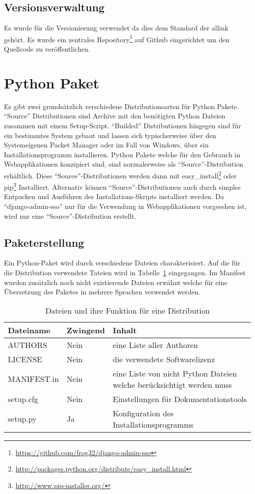\subsection{Versionsverwaltung}
\label{sub:versionsverwaltung}
Es wurde  für die Versionierung verwendet da dies dem Standard der allink gehört. Es wurde ein zentrales Repository\footnote{\url{https://github.com/frog32/django-admin-sso}} auf Github eingerichtet um den Quellcode zu veröffentlichen.

\section{Python Paket}
\label{sec:Python Paket}
Es gibt zwei grundsätzlich verschiedene Distributionsarten für Python Pakete. ``Source'' Distributionen sind Archive mit den benötigten Python Dateien zusammen mit einem Setup-Script. ``Builded'' Distributionen hingegen sind für ein bestimmtes System gebaut und lassen sich typischerweise über den Systemeigenen Packet Manager oder im Fall von Windows, über ein Installationsprogramm installieren. Python Pakete welche für den Gebrauch in Webapplikationen konzipiert sind, sind normalerweise als ``Source''-Distribution erhältlich. Diese ``Source''-Distributionen werden dann mit easy\_install\footnote{\url{http://packages.python.org/distribute/easy_install.html}} oder pip\footnote{\url{http://www.pip-installer.org/}} Installiert. Alternativ können ``Source''-Distributionen auch durch simples Entpacken und Ausführen des Installations-Skripts installiert werden. Da ``django-admin-sso'' nur für die Verwendung in Webapplikationen vorgesehen ist, wird nur eine ``Source''-Distribution erstellt.

\subsection{Paketerstellung}
\label{sub:paketerstellung}
Ein Python-Paket wird durch verschiedene Dateien charakterisiert. Auf die für die Distribution verwendete Tateien wird in Tabelle~\ref{tab:paket_inhalt} eingegangen. Im Manifest wurden zusätzlich noch nicht existierende Dateien erwähnt welche für eine Übersetzung des Paketes in mehrere Sprachen verwendet werden.

\begin{table}[ht]
  \centering
  \begin{tabular}{|l|l|p{7cm}|}
  \hline
  Dateiname & Zwingend & Inhalt\\
  \hline
  AUTHORS & Nein & eine Liste aller Authoren\\
  \hline
  LICENSE & Nein & die verwendete Softwarelizenz\\
  \hline
  MANIFEST.in & Nein & eine Liste von nicht Python Dateien welche berücksichtigt werden muss\\
  \hline
  setup.cfg & Nein & Einstellungen für Dokumentationstools\\
  \hline
  setup.py & Ja & Konfiguration des Installationsprogramms\\
  \hline
  \end{tabular}
  \caption{Dateien und ihre Funktion für eine Distribution}
  \label{tab:paket_inhalt}
\end{table}

